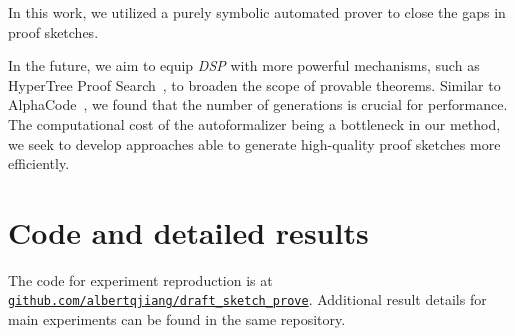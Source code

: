 In this work, we utilized a purely symbolic automated prover to close the gaps in proof sketches. 

In the future, we aim to equip \textit{DSP} with more powerful mechanisms, such as HyperTree Proof Search~\citep{lample2022hypertree}, to broaden the scope of provable theorems. Similar to AlphaCode~\citep{li2022alphacode}, we found that the number of generations is crucial for performance. The computational cost of the autoformalizer being a bottleneck in our method, we seek to develop approaches able to generate high-quality proof sketches more efficiently.

\section*{Code and detailed results} The code for experiment reproduction is at \href{https://github.com/albertqjiang/draft_sketch_prove}{\small \texttt{github.com/albertqjiang/draft\_sketch\_prove}}. Additional result details for main experiments can be found in the same repository.



